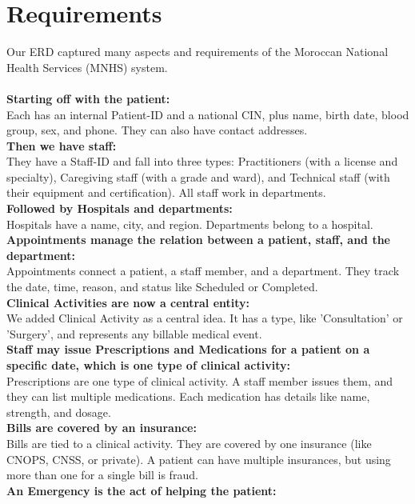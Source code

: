 \documentclass[a4paper,12pt]{article}
\begin{document}
\section{Requirements}
Our ERD captured many aspects and requirements of the Moroccan National Health Services (MNHS) system.\\
\\
\textbf{\color{blue}Starting off with the patient:}\\
Each has an internal Patient-ID and a national CIN, plus name, birth date, blood group, sex, and phone. They can also have contact addresses.
\\
\textbf{\color{blue}Then we have staff:}\\
They have a Staff-ID and fall into three types: Practitioners (with a license and specialty), Caregiving staff (with a grade and ward), and Technical staff (with their equipment and certification). All staff work in departments.
\\
\textbf{\color{blue}Followed by Hospitals and departments:}\\
Hospitals have a name, city, and region. Departments belong to a hospital.
\\
\textbf{\color{blue}Appointments manage the relation between a patient, staff, and the department:}\\
Appointments connect a patient, a staff member, and a department. They track the date, time, reason, and status like Scheduled or Completed.
\\
\textbf{\color{blue}Clinical Activities are now a central entity:}\\
We added Clinical Activity as a central idea. It has a type, like 'Consultation' or 'Surgery', and represents any billable medical event.
\\
\textbf{\color{blue}Staff may issue Prescriptions and Medications for a patient on a specific date, which is one type of clinical activity:}\\
Prescriptions are one type of clinical activity. A staff member issues them, and they can list multiple medications. Each medication has details like name, strength, and dosage.
\\
\textbf{\color{blue}Bills are covered by an insurance:}\\
Bills are tied to a clinical activity. They are covered by one insurance (like CNOPS, CNSS, or private). A patient can have multiple insurances, but using more than one for a single bill is fraud.
\\
\textbf{\color{blue}An Emergency is the act of helping the patient:}\\
\end{document}
